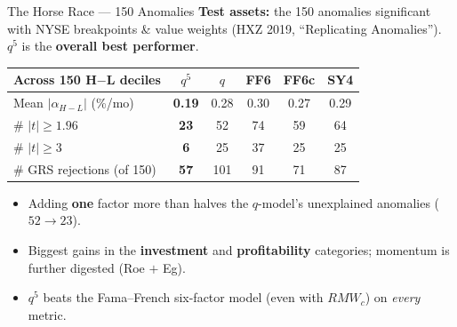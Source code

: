 \documentclass{beamer}
\begin{document}
\begin{frame}{The Horse Race --- 150 Anomalies}
	\textbf{Test assets:} the 150 anomalies significant with NYSE breakpoints \& value weights (HXZ 2019, ``Replicating Anomalies''). $q^5$ is the \textbf{overall best performer}.
	\begin{center}
		\small
		\begin{tabular}{@{}lccccc@{}}
			\toprule
			Across 150 H$-$L deciles & $q^5$ & $q$ & FF6 & FF6c & SY4 \\
			\midrule
			Mean $|\alpha_{H-L}|$ (\%/mo) & \textbf{0.19} & 0.28 & 0.30 & 0.27 & 0.29 \\
			\# $|t|\ge1.96$               & \textbf{23}   & 52   & 74   & 59   & 64 \\
			\# $|t|\ge3$                  & \textbf{6}    & 25   & 37   & 25   & 25 \\
			\# GRS rejections (of 150)    & \textbf{57}   & 101  & 91   & 71   & 87 \\
			\bottomrule
		\end{tabular}
	\end{center}
	\begin{itemize}
		\item Adding \textbf{one} factor more than halves the $q$-model's unexplained anomalies ($52\to23$).
		\item Biggest gains in the \textbf{investment} and \textbf{profitability} categories; momentum is further digested (Roe $+$ Eg).
		\item $q^5$ beats the Fama--French six-factor model (even with $RMW_c$) on \textit{every} metric.
	\end{itemize}
\end{frame}
\end{document}
